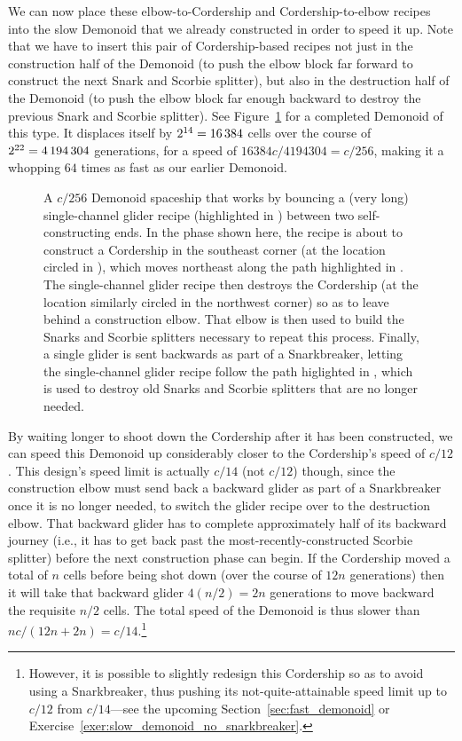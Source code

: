 We can now place these elbow-to-Cordership and Cordership-to-elbow recipes into the slow Demonoid that we already constructed in order to speed it up. Note that we have to insert this pair of Cordership-based recipes not just in the construction half of the Demonoid (to push the elbow block far forward to construct the next Snark and Scorbie splitter), but also in the destruction half of the Demonoid (to push the elbow block far enough backward to destroy the previous Snark and Scorbie splitter). See Figure~\ref{fig:c256_demonoid} for a completed Demonoid of this type. It displaces itself by $2^{14} = 16{\,}384$ cells over the course of $2^{22} = 4{\,}194{\,}304$ generations, for a speed of $16384c/4194304 = c/256$, making it a whopping $64$ times as fast as our earlier Demonoid.

\begin{figure}[!htbp]
	\centering
	\caption{A $c/256$ Demonoid spaceship that works by bouncing a (very long) single-channel glider recipe (highlighted in ) between two self-constructing ends. In the phase shown here, the recipe is about to construct a Cordership in the southeast corner (at the location circled in ), which moves northeast along the path highlighted in . The single-channel glider recipe then destroys the Cordership (at the location similarly circled in the northwest corner) so as to leave behind a construction elbow. That elbow is then used to build the Snarks and Scorbie splitters necessary to repeat this process. Finally, a single glider is sent backwards as part of a Snarkbreaker, letting the single-channel glider recipe follow the path higlighted in , which is used to destroy old Snarks and Scorbie splitters that are no longer needed.}\label{fig:c256_demonoid}
\end{figure}

By waiting longer to shoot down the Cordership after it has been constructed, we can speed this Demonoid up considerably closer to the Cordership's speed of $c/12$. This design's speed limit is actually $c/14$ (not $c/12$) though, since the construction elbow must send back a backward glider as part of a Snarkbreaker once it is no longer needed, to switch the glider recipe over to the destruction elbow. That backward glider has to complete approximately half of its backward journey (i.e., it has to get back past the most-recently-constructed Scorbie splitter) before the next construction phase can begin. If the Cordership moved a total of $n$ cells before being shot down (over the course of $12n$ generations) then it will take that backward glider $4(n/2) = 2n$ generations to move backward the requisite $n/2$ cells. The total speed of the Demonoid is thus slower than $nc/(12n + 2n) = c/14$.\footnote{However, it is possible to slightly redesign this Cordership so as to avoid using a Snarkbreaker, thus pushing its not-quite-attainable speed limit up to $c/12$ from $c/14$---see the upcoming Section~\ref{sec:fast_demonoid} or Exercise~\ref{exer:slow_demonoid_no_snarkbreaker}.}


